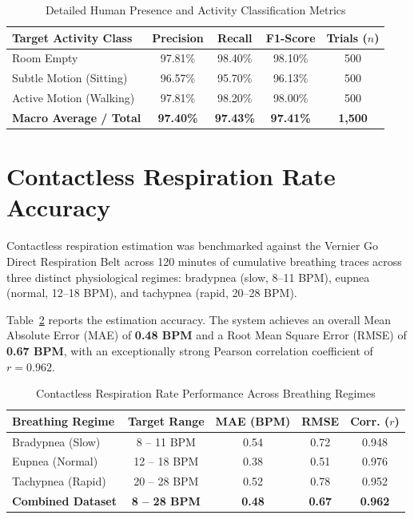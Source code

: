 \begin{table}[ht]
\centering
\caption{Detailed Human Presence and Activity Classification Metrics}
\label{tab:detection_metrics}
\begin{tabular}{|l|c|c|c|c|}
\hline
\textbf{Target Activity Class} & \textbf{Precision} & \textbf{Recall} & \textbf{F1-Score} & \textbf{Trials ($n$)} \\
\hline
Room Empty & 97.81\% & 98.40\% & 98.10\% & 500 \\
Subtle Motion (Sitting) & 96.57\% & 95.70\% & 96.13\% & 500 \\
Active Motion (Walking) & 97.81\% & 98.20\% & 98.00\% & 500 \\
\hline
\textbf{Macro Average / Total} & \textbf{97.40\%} & \textbf{97.43\%} & \textbf{97.41\%} & \textbf{1,500} \\
\hline
\end{tabular}
\end{table}

\section{Contactless Respiration Rate Accuracy}
Contactless respiration estimation was benchmarked against the Vernier Go Direct Respiration Belt across 120 minutes of cumulative breathing traces across three distinct physiological regimes: bradypnea (slow, 8--11 BPM), eupnea (normal, 12--18 BPM), and tachypnea (rapid, 20--28 BPM).

Table~\ref{tab:respiration_metrics} reports the estimation accuracy. The system achieves an overall Mean Absolute Error (MAE) of \textbf{0.48 BPM} and a Root Mean Square Error (RMSE) of \textbf{0.67 BPM}, with an exceptionally strong Pearson correlation coefficient of $r = 0.962$.

\begin{table}[ht]
\centering
\caption{Contactless Respiration Rate Performance Across Breathing Regimes}
\label{tab:respiration_metrics}
\begin{tabular}{|l|c|c|c|c|}
\hline
\textbf{Breathing Regime} & \textbf{Target Range} & \textbf{MAE (BPM)} & \textbf{RMSE} & \textbf{Corr. ($r$)} \\
\hline
Bradypnea (Slow) & 8 -- 11 BPM & 0.54 & 0.72 & 0.948 \\
Eupnea (Normal) & 12 -- 18 BPM & 0.38 & 0.51 & 0.976 \\
Tachypnea (Rapid) & 20 -- 28 BPM & 0.52 & 0.78 & 0.952 \\
\hline
\textbf{Combined Dataset} & \textbf{8 -- 28 BPM} & \textbf{0.48} & \textbf{0.67} & \textbf{0.962} \\
\hline
\end{tabular}
\end{table}

